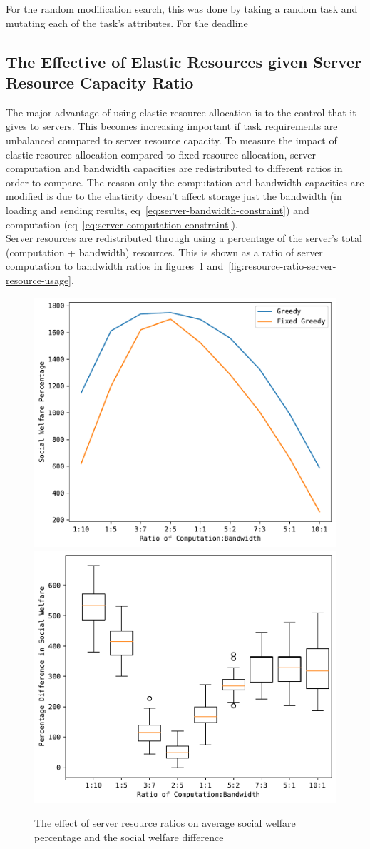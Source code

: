 For the random modification search, this was done by taking a random task and mutating each of the task's attributes.
For the deadline

\subsection{The Effective of Elastic Resources given Server Resource Capacity Ratio}
\label{subsec:the-effective-of-elastic-resources-given-server-resource-capacity-ratio}
The major advantage of using elastic resource allocation is to the control that it gives to servers. This becomes
increasing important if task requirements are unbalanced compared to server resource capacity. To measure the impact
of elastic resource allocation compared to fixed resource allocation, server computation and bandwidth capacities
are redistributed to different ratios in order to compare. The reason only the computation and bandwidth capacities
are modified is due to the elasticity doesn't affect storage just the bandwidth (in loading and sending results,
eq~\ref{eq:server-bandwidth-constraint}) and computation (eq~\ref{eq:server-computation-constraint}). \\
Server resources are redistributed through using a percentage of the server's total (computation + bandwidth) resources.
This is shown as a ratio of server computation to bandwidth ratios in figures~\ref{fig:resource-ratio-social-welfare}
and~\ref{fig:resource-ratio-server-resource-usage}.

\begin{figure}[h]
    \centering
    \includegraphics[width=0.45\linewidth]{figs/resource_ratio/social_welfare.pdf}
    \includegraphics[width=0.45\linewidth]{figs/resource_ratio/social_welfare_difference.pdf}
    \caption{The effect of server resource ratios on average social welfare percentage and the social welfare difference}
    \label{fig:resource-ratio-social-welfare}
\end{figure}

